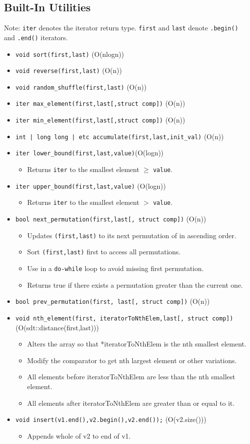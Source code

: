 \documentclass{article}
\newcommand{\citem}[1]{\item \texttt{#1}}
\begin{document}
\subsection{Built-In Utilities}
Note: \texttt{iter} denotes the iterator return type. \texttt{first} and \texttt{last} denote \texttt{.begin()} and \texttt{.end()} iterators.
\begin{itemize}
    \citem{void sort(first,last)} (O(nlogn))
    \citem{void reverse(first,last)} (O(n))
    \citem{void random\_shuffle(first,last)} (O(n))
    \citem{iter max\_element(first,last[,struct comp])} (O(n))
    \citem{iter min\_element(first,last[,struct comp])} (O(n))
    \citem{int | long long | etc accumulate(first,last,init\_val)} (O(n))
    \citem{iter lower\_bound(first,last,value)}(O(logn))
    \begin{itemize}
        \item Returns \texttt{iter} to the smallest element $\geq$ \texttt{value}.
    \end{itemize}
    \citem{iter upper\_bound(first,last,value)} (O(logn))
    \begin{itemize}
        \item Returns \texttt{iter} to the smallest element $>$ \texttt{value}.
    \end{itemize}
    \citem{bool next\_permutation(first,last[, struct comp])} (O(n))
    \begin{itemize}
        \item Updates \texttt{(first,last)} to its next permutation of in ascending order.
        \item Sort \texttt{(first,last)} first to access all permutations.
        \item Use in a \texttt{do-while} loop to avoid missing first permutation.
        \item Returns true if there exists a permutation greater than the current one.
    \end{itemize}
    \citem{bool prev\_permutation(first, last[, struct comp])} (O(n))
    \citem{void nth\_element(first, iteratorToNthElem,last[, struct comp])} (O(sdt::distance(first,last)))
    \begin{itemize}
        \item Alters the array so that *iteratorToNthElem is the nth smallest element.
        \item Modify the comparator to get nth largest element or other variations.
        \item All elements before iteratorToNthElem are less than the nth smallest element.
        \item All elements after iteratorToNthElem are greater than or equal to it.
    \end{itemize}
    \citem{void insert(v1.end(),v2.begin(),v2.end());} (O(v2.size()))
    \begin{itemize}
        \item Appends whole of v2 to end of v1.
    \end{itemize}
\end{itemize}
\end{document}
